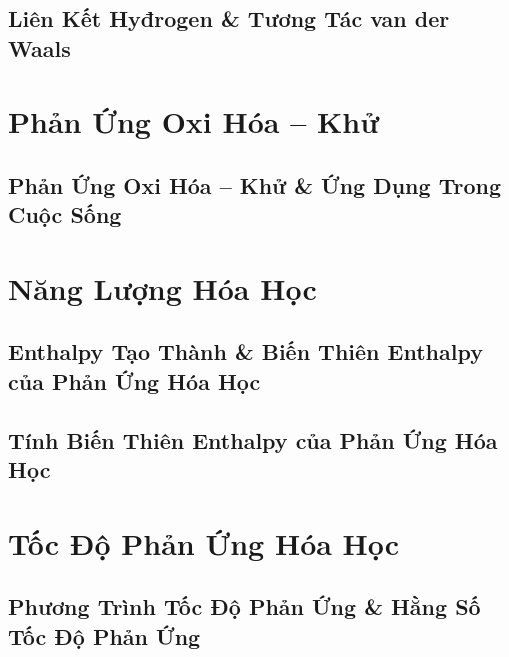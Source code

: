\documentclass[oneside]{book}
\numberwithin{equation}{section}
\begin{document}

\section{Liên Kết Hyđrogen \& Tương Tác van der Waals}


\chapter{Phản Ứng Oxi Hóa -- Khử}

\section{Phản Ứng Oxi Hóa -- Khử \& Ứng Dụng Trong Cuộc Sống}


\chapter{Năng Lượng Hóa Học}

\section{Enthalpy Tạo Thành \& Biến Thiên Enthalpy của Phản Ứng Hóa Học}


\section{Tính Biến Thiên Enthalpy của Phản Ứng Hóa Học}


\chapter{Tốc Độ Phản Ứng Hóa Học}

\section{Phương Trình Tốc Độ Phản Ứng \& Hằng Số Tốc Độ Phản Ứng}
\end{document}
